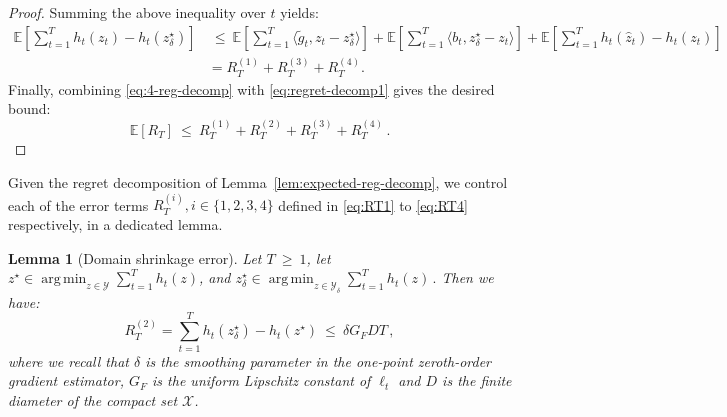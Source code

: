 \documentclass[a4paper,11pt,fullpage]{article}
\def\X{{\mathcal X}}
\def\Y{{\mathcal Y}}
\theoremstyle{plain}
\newtheorem{lemma}{Lemma}
\theoremstyle{definition}
\theoremstyle{plain}
\DeclareMathOperator*{\argmin}{arg\,min}
\renewcommand{\leq}{~\le~}
\renewcommand{\geq}{~\ge~}
\begin{document}
\begin{proof}
Summing the above inequality over $t$ yields: 
\begin{align}
\label{eq:4-reg-decomp}
\mathbb{E}\left[ \sum_{t=1}^T h_t(z_t) -  h_t(z_{\delta}^{\star}) \right] 
&\leq  \mathbb{E}\left[\sum_{t=1}^T \langle \tilde{g}_t, z_t - z_{\delta}^{\star}\rangle \right] + \mathbb{E}\left[\sum_{t=1}^T \langle b_t, z^{\star}_{\delta} - z_t \rangle \right] + \mathbb{E}\left[ \sum_{t=1}^T h_t(\hat{z}_t) - h_t(z_t)\right]\nonumber\\ 
&= R_T^{(1)} + R_T^{(3)} + R_T^{(4)}. 
\end{align}
Finally, combining \eqref{eq:4-reg-decomp} with \eqref{eq:regret-decomp1} gives the desired bound: 
\begin{equation*}
\mathbb{E}[R_T] \leq R_T^{(1)} + R_T^{(2)} + R_T^{(3)} + R_T^{(4)}\,.
\end{equation*}
\end{proof}

Given the regret decomposition of Lemma~\ref{lem:expected-reg-decomp}, we control each of the error terms $R_T^{(i)}, i \in \{ 1,2,3,4\}$ defined in \eqref{eq:RT1} to \eqref{eq:RT4} respectively, in a dedicated lemma.   

\begin{tcolorbox}[colframe=white!, top=2pt,left=2pt,right=2pt,bottom=2pt] 
\begin{lemma}[Domain shrinkage error]
\label{lem:domain-shrinkage-error}
Let $T \geq 1$, let $z^{\star} \in \argmin_{z \in \Y} \sum_{t=1}^T h_t(z)$, and $z^{\star}_{\delta} \in \argmin_{z \in \Y_{\delta}} \sum_{t=1}^T h_t(z)\,.$ Then we have: 
\begin{equation*}
R_T^{(2)} = \sum_{t=1}^T h_t(z_{\delta}^{\star}) - h_t(z^{\star}) \leq \delta G_FDT\,,
\end{equation*}
where we recall that $\delta$ is the smoothing parameter in the one-point zeroth-order gradient estimator, $G_F$ is the uniform Lipschitz constant of $\ell_t$ and $D$ is the finite diameter of the compact set $\X$. 
\end{lemma}
\end{tcolorbox}
\end{document}

